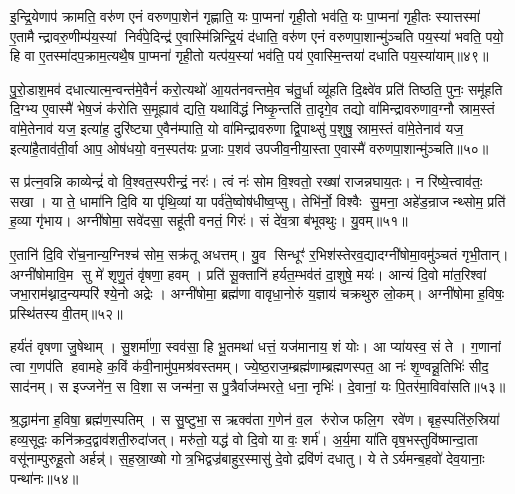 इ॒न्द्रि॒येणाप॑ क्रामति॒ वरु॑ण एनं वरुणपा॒शेन॑ गृह्णाति॒ यः पा॒प्मना॑ गृही॒तो भव॑ति॒ यः पा॒प्मना॑ गृही॒तः स्यात्तस्मा॑ ए॒तामैन्द्रावरु॒णीम्प॑य॒स्यां निर्व॑पे॒दिन्द्र॑ ए॒वास्मि॑न्निन्द्रि॒यं द॑धाति॒ वरु॑ण एनं वरुणपा॒शान्मु॑ञ्चति पय॒स्या॑ भवति॒ पयो॒ हि वा ए॒तस्मा॑दप॒क्राम॒त्यथै॒ष पा॒प्मना॑ गृही॒तो यत्प॑य॒स्या॑ भव॑ति॒ पय॑ ए॒वास्मि॒न्तया॑ दधाति पय॒स्या॑याम्॥४९॥

पु॒रो॒डाश॒मव॑ दधात्यात्म॒न्वन्त॑मे॒वैनं॑ करो॒त्यथो॑ आ॒यत॑नवन्तमे॒व च॑तु॒र्धा व्यू॑हति दि॒क्ष्वे॑व प्रति॑ तिष्ठति॒ पुनः॒ समू॑हति दि॒ग्भ्य ए॒वास्मै॑ भेष॒जं क॑रोति स॒मूह्याव॑ द्यति॒ यथावि॑द्धं निष्कृ॒न्तति॑ ता॒दृगे॒व तद्यो वा॑मिन्द्रावरुणाव॒ग्नौ स्राम॒स्तं वा॑मे॒तेनाव॑ यज॒ इत्या॑ह॒ दुरि॑ष्ट्या ए॒वैन॑म्पाति॒ यो वा॑मिन्द्रावरुणा द्वि॒पाथ्सु॑ प॒शुषु॒ स्राम॒स्तं वा॑मे॒तेनाव॑ यज॒ इत्या॑है॒ताव॑ती॒र्वा आप॒ ओष॑धयो॒ वन॒स्पत॑यः प्र॒जाः प॒शव॑ उपजीव॒नीया॒स्ता ए॒वास्मै॑ वरुणपा॒शान्मु॑ञ्चति॥५०॥

{\anuvakamend[{ए॒तस्य॑ पय॒स्या॑याम्पाति॒ षड्विꣳ॑शतिश्च॥13॥}]}

स प्र॑त्न॒वन्नि काव्येन्द्रं॑ वो वि॒श्वत॒स्परीन्द्रं॒ नरः॑। त्वं नः॑ सोम वि॒श्वतो॒ रख्षा॑ राजन्नघाय॒तः। न रि॑ष्ये॒त्त्वाव॑तः॒ सखा। या ते॒ धामा॑नि दि॒वि या पृ॑थि॒व्यां या पर्व॑ते॒ष्वोष॑धीष्व॒प्सु। तेभि॑र्नो॒ विश्वैः सु॒मना॒ अहे॑ड॒न्राजन्थ्सोम॒ प्रति॑ ह॒व्या गृ॑भाय। अग्नी॑षोमा॒ सवे॑दसा॒ सहू॑ती वनतं॒ गिरः॑। सं दे॑व॒त्रा ब॑भूवथुः। यु॒वम्॥५१॥

ए॒तानि॑ दि॒वि रो॑च॒नान्य॒ग्निश्च॑ सोम॒ सक्र॑तू अधत्तम्। यु॒व सिन्धूꣳ॑ र॒भिश॑स्तेरव॒द्यादग्नी॑षोमा॒वमु॑ञ्चतं गृभी॒तान्। अग्नी॑षोमावि॒म सु मे॑ शृणु॒तं वृ॑षणा॒ हवम्। प्रति॑ सू॒क्तानि॑ हर्यत॒म्भव॑तं दा॒शुषे॒ मयः॑। आन्यं दि॒वो मा॑त॒रिश्वा॑ जभा॒राम॑थ्नाद॒न्यम्परि॑ श्ये॒नो अद्रेः। अग्नी॑षोमा॒ ब्रह्म॑णा वावृधा॒नोरुं य॒ज्ञाय॑ चक्रथुरु लो॒कम्। अग्नी॑षोमा ह॒विषः॒ प्रस्थि॑तस्य वी॒तम्॥५२॥

हर्य॑तं वृषणा जु॒षेथाम्। सु॒शर्मा॑णा॒ स्वव॑सा॒ हि भू॒तमथा॑ धत्तं॒ यज॑मानाय॒ शं योः। आ प्या॑यस्व॒ सं ते। ग॒णानां त्वा ग॒णप॑ति हवामहे क॒विं क॑वी॒नामु॑प॒मश्र॑वस्तमम्। ज्ये॒ष्ठ॒राज॒म्ब्रह्म॑णाम्ब्रह्मणस्पत॒ आ नः॑ शृ॒ण्वन्नू॒तिभिः॑ सीद॒ साद॑नम्। स इज्जने॑न॒ स वि॒शा स जन्म॑ना॒ स पु॒त्रैर्वाज॑म्भरते॒ धना॒ नृभिः॑। दे॒वानां॒ यः पि॒तर॑मा॒विवा॑सति॥५३॥

श्र॒द्धाम॑ना ह॒विषा॒ ब्रह्म॑ण॒स्पतिम्। स सु॒ष्टुभा॒ स ऋक्व॑ता ग॒णेन॑ व॒ल रु॑रोज फलि॒ग रवे॑ण। बृह॒स्पति॑रु॒स्रिया॑ हव्य॒सूदः॒ कनि॑क्रद॒द्वाव॑शती॒रुदा॑जत्। मरु॑तो॒ यद्ध॑ वो दि॒वो या वः॒ शर्म॑। अ॒र्य॒मा या॑ति वृष॒भस्तुवि॑ष्मान्दा॒ता वसू॑नाम्पुरुहू॒तो अर्\mbox{}हन्न्॑। स॒ह॒स्रा॒ख्षो गोत्र॒भिद्वज्र॑बाहुर॒स्मासु॑ दे॒वो द्रवि॑णं दधातु। ये तेऽर्यमन्ब॒हवो॑ देव॒यानाः॒ पन्था॑नः॥५४॥

